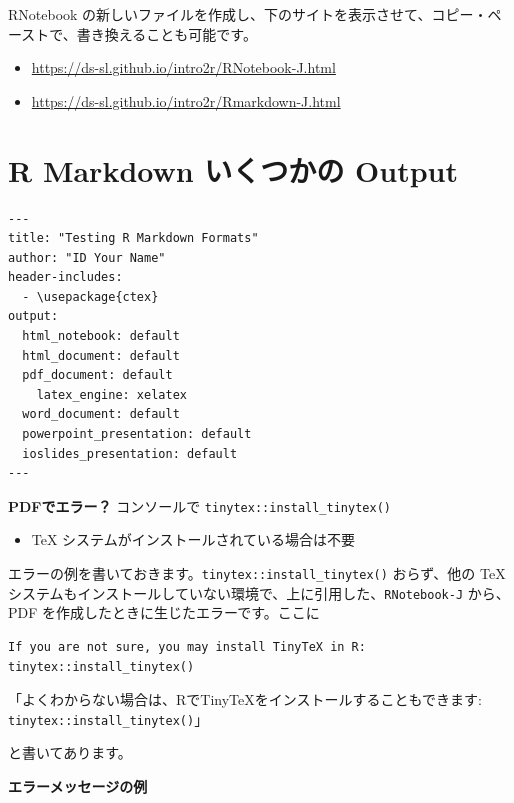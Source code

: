 \documentclass[
  xelatex, ja=standard]{bxjsbook}
\providecommand{\tightlist}{%
  \setlength{\itemsep}{0pt}\setlength{\parskip}{0pt}}
\theoremstyle{definition}
\theoremstyle{definition}
\theoremstyle{definition}
\theoremstyle{definition}
\theoremstyle{remark}
\begin{document}
RNotebook の新しいファイルを作成し、下のサイトを表示させて、コピー・ペーストで、書き換えることも可能です。

\begin{itemize}
\tightlist
\item
  \url{https://ds-sl.github.io/intro2r/RNotebook-J.html}
\item
  \url{https://ds-sl.github.io/intro2r/Rmarkdown-J.html}
\end{itemize}

\hypertarget{r-markdown-ux3044ux304fux3064ux304bux306e-output}{%
\section{R Markdown いくつかの Output}\label{r-markdown-ux3044ux304fux3064ux304bux306e-output}}

\begin{verbatim}
---
title: "Testing R Markdown Formats"
author: "ID Your Name"
header-includes:
  - \usepackage{ctex}
output:
  html_notebook: default
  html_document: default
  pdf_document: default
    latex_engine: xelatex
  word_document: default
  powerpoint_presentation: default
  ioslides_presentation: default
---
\end{verbatim}

\textbf{PDFでエラー？} コンソールで \texttt{tinytex::install\_tinytex()}

\begin{itemize}
\tightlist
\item
  TeX システムがインストールされている場合は不要
\end{itemize}

エラーの例を書いておきます。\texttt{tinytex::install\_tinytex()} おらず、他の TeX システムもインストールしていない環境で、上に引用した、\texttt{RNotebook-J} から、PDF を作成したときに生じたエラーです。ここに

\begin{verbatim}
If you are not sure, you may install TinyTeX in R: tinytex::install_tinytex()
\end{verbatim}

「よくわからない場合は、RでTinyTeXをインストールすることもできます: \texttt{tinytex::install\_tinytex()}」

と書いてあります。

\textbf{エラーメッセージの例}
\end{document}
